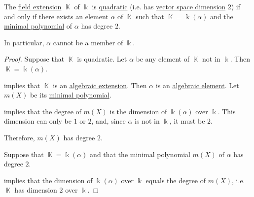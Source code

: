 \begin{lemma}\label{thm:quadratic_extension_minimal_polynomial}
  The \hyperref[def:field/subobject]{field extension} \( \BbbK \) of \( \Bbbk \) is \hyperref[def:field_extension_degree]{quadratic} (i.e. has \hyperref[def:vector_space_dimension]{vector space dimension} \( 2 \)) if and only if there exists an element \( \alpha \) of \( \BbbK \) such that \( \BbbK = \Bbbk(\alpha) \) and the \hyperref[def:algebraic_element_minimal_polynomial]{minimal polynomial} of \( \alpha \) has degree \( 2 \).
\end{lemma}
\begin{comments}
  \item In particular, \( \alpha \) cannot be a member of \( \Bbbk \).
\end{comments}
\begin{proof}
  \SufficiencySubProof Suppose that \( \BbbK \) is quadratic. Let \( \alpha \) be any element of \( \BbbK \) not in \( \Bbbk \). Then \( \BbbK = \Bbbk(\alpha) \).

   implies that \( \BbbK \) is an \hyperref[def:algebraic_extension]{algebraic extension}. Then \( \alpha \) is an \hyperref[def:algebraic_element]{algebraic element}. Let \( m(X) \) be its \hyperref[def:algebraic_element_minimal_polynomial]{minimal polynomial}.

   implies that the degree of \( m(X) \) is the dimension of \( \Bbbk(\alpha) \) over \( \Bbbk \). This dimension can only be \( 1 \) or \( 2 \), and, since \( \alpha \) is not in \( \Bbbk \), it must be \( 2 \).

  Therefore, \( m(X) \) has degree \( 2 \).

  \NecessitySubProof Suppose that \( \BbbK = \Bbbk(\alpha) \) and that the minimal polynomial \( m(X) \) of \( \alpha \) has degree \( 2 \).

   implies that the dimension of \( \Bbbk(\alpha) \) over \( \Bbbk \) equals the degree of \( m(X) \), i.e. \( \BbbK \) has dimension \( 2 \) over \( \Bbbk \).
\end{proof}

